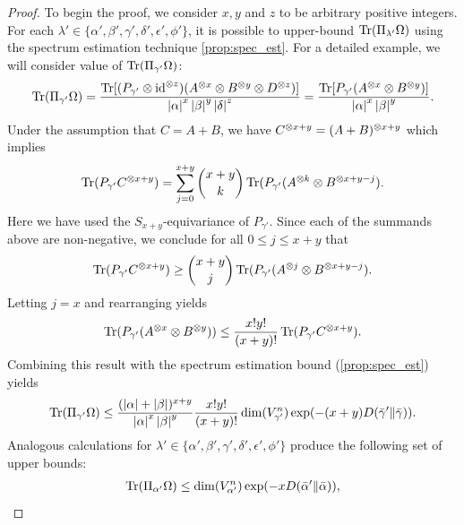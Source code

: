 \documentclass[notitlepage, 10pt]{article}
\begin{document}
\begin{proof}
    To begin the proof, we consider $x,y$ and $z$ to be arbitrary positive integers.
    For each $\lambda' \in \{\alpha', \beta', \gamma', \delta', \epsilon', \phi'\}$, it is possible to upper-bound $\operatorname{Tr}(\Pi_{\lambda'} \Omega)$ using the spectrum estimation technique \cref{prop:spec_est}.
    For a detailed example, we will consider value of $\operatorname{Tr}(\Pi_{\gamma'} \Omega)$:
    \begin{align}
        \operatorname{Tr}(\Pi_{\gamma'} \Omega)
        = \frac{\operatorname{Tr}[(P_{\gamma'} \otimes \operatorname{id}^{\otimes z})(A^{\otimes x}\otimes B^{\otimes y} \otimes D^{\otimes z})]}{\left|\alpha\right|^{x}\left|\beta\right|^{y}\left|\delta\right|^{z}}
        = \frac{\operatorname{Tr}[P_{\gamma'}(A^{\otimes x}\otimes B^{\otimes y})]}{\left|\alpha\right|^{x}\left|\beta\right|^{y}}.
    \end{align}
    Under the assumption that $C = A+B$, we have $C^{\otimes x+y} = (A+B)^{\otimes x+y}$ which implies
    \begin{equation}
        \operatorname{Tr}(P_{\gamma'} C^{\otimes x+y}) = \sum_{j=0}^{x+y} \binom{x+y}{k} \operatorname{Tr}(P_{\gamma'} (A^{\otimes k} \otimes B^{\otimes x+y-j}).
    \end{equation}
    Here we have used the $S_{x+y}$-equivariance of $P_{\gamma'}$.
    Since each of the summands above are non-negative, we conclude for all $0 \leq j \leq x+y$ that
    \begin{equation}
        \operatorname{Tr}(P_{\gamma'} C^{\otimes x+y}) \geq \binom{x+y}{j} \operatorname{Tr}(P_{\gamma'} (A^{\otimes j} \otimes B^{\otimes x+y-j}).
    \end{equation}
    Letting $j = x$ and rearranging yields
    \begin{equation}
        \operatorname{Tr}(P_{\gamma'} (A^{\otimes x} \otimes B^{\otimes y})) \leq \frac{x!y!}{(x+y)!}\operatorname{Tr}(P_{\gamma'} C^{\otimes x+y}).
    \end{equation}
    Combining this result with the spectrum estimation bound (\cref{prop:spec_est}) yields
    \begin{align}
        \operatorname{Tr}(\Pi_{\gamma'} \Omega)
        \leq \frac{(\left|\alpha\right|+\left|\beta\right|)^{x+y}}{\left|\alpha\right|^{x}\left|\beta\right|^{y}}\frac{x!y!}{(x+y)!}\dim(V_{\gamma'}^{n})\exp(-(x+y)D\!\left(\bar \gamma'\middle\|\bar \gamma\right)).
    \end{align}
    Analogous calculations for $\lambda' \in \{\alpha', \beta', \gamma', \delta', \epsilon', \phi'\}$ produce the following set of upper bounds:
    \begin{align}
        \Tr(\Pi_{\alpha'} \Omega)
        &\leq \dim(V_{\alpha'}^{n}) \exp(- x \kl{\bar \alpha'}{\bar \alpha}), \\

\end{align}
\end{proof}
\end{document}
